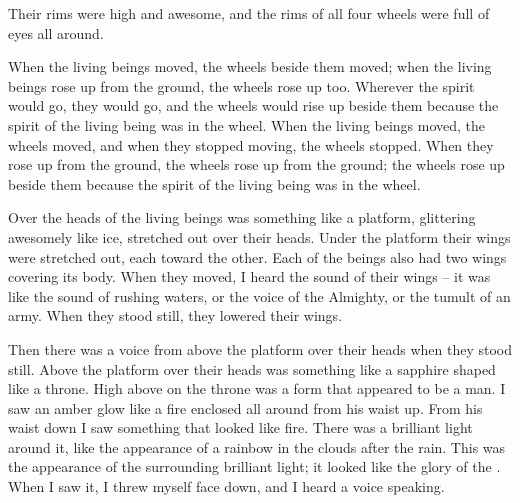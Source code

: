 {Their rims
were high
and awesome,
and the rims
of all four
wheels were full
of eyes
all around.
\par }{\PP {}When
the living
beings moved,
the wheels
beside
them moved; when
the living
beings rose up from the ground,
the wheels
rose up too.
Wherever
the spirit
would go,
they would
go,
and the wheels
would rise up
beside
them because
the spirit
of the living
being was in the wheel.
When
the living beings moved,
the wheels moved,
and when
they stopped
moving, the wheels stopped.
When
they rose up
from the ground,
the wheels rose
up from the ground; the wheels
rose up beside
them because
the spirit
of the living
being was
in
the wheel.
\par }{\PP {}Over
the heads
of the living
beings
was something like a platform,
glittering awesomely
like ice,
stretched
out over
their heads.
Under
the platform
their wings
were
stretched out,
each
toward the other.
Each of the beings
also had two
wings covering
its body.
When
they moved, I heard
the
sound
of their wings
– it was like the sound
of rushing
waters,
or the voice
of the Almighty,
or the tumult
of an army.
When they stood
still, they lowered their wings.
\par }{\PP {}Then there was
a voice
from above
the platform
over
their heads
when they stood
still.
Above
the platform
over
their heads
was something like
a sapphire
shaped like
a throne.
High above on
the throne
was a form
that appeared
to be a man.
I saw
an amber
glow
like a fire
enclosed
all around
from his waist
up.
From his waist
down
I saw
something
that looked like fire.
There was a brilliant light
around it,
like the appearance
of a rainbow
in the clouds
after
the rain.
This
was the appearance
of the surrounding
brilliant light;
it
looked
like
the glory
of the {}. When I saw
it, I threw
myself face
down, and I heard
a voice
speaking.

\par }
